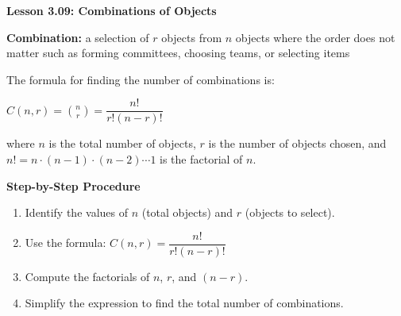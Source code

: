 \begin{center}
\textbf{Lesson 3.09: Combinations of Objects}
\end{center}

\vspace*{-1.5ex}

\noindent\textbf{Combination:} a selection of \(r\) objects from \(n\) objects where the order does not matter such as forming committees, choosing teams, or selecting items

\noindent The formula for finding the number of combinations is:

{\centering $ 
    C(n, r) = \binom{n}{r} = \dfrac{n!}{r!(n-r)!}
 $\par}

\noindent where \(n\) is the total number of objects, \(r\) is the number of objects chosen, and \(n! = n \cdot (n-1) \cdot (n-2) \cdots 1\) is the factorial of \(n\).

\noindent\textbf{Step-by-Step Procedure}

\begin{enumerate}
    \item Identify the values of \(n\) (total objects) and \(r\) (objects to select).
    \item Use the formula:    \(C(n, r) = \dfrac{n!}{r!(n-r)!}\)
    \item Compute the factorials of \(n\), \(r\), and \((n-r)\).
    \item Simplify the expression to find the total number of combinations.
\end{enumerate}
